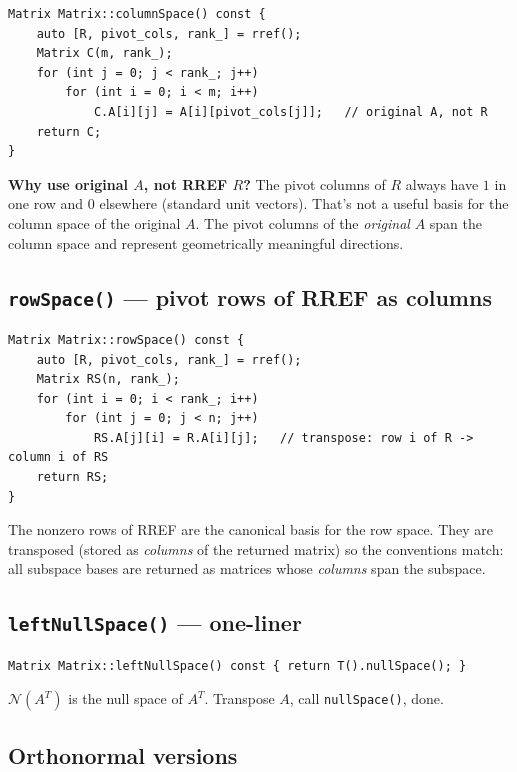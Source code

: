\documentclass[12pt, a4paper]{article}
\newcommand{\fn}[1]{\texttt{\small\color{funcgreen}#1}}
\begin{document}
\begin{lstlisting}
Matrix Matrix::columnSpace() const {
    auto [R, pivot_cols, rank_] = rref();
    Matrix C(m, rank_);
    for (int j = 0; j < rank_; j++)
        for (int i = 0; i < m; i++)
            C.A[i][j] = A[i][pivot_cols[j]];   // original A, not R
    return C;
}
\end{lstlisting}

\textbf{Why use original $A$, not RREF $R$?}  The pivot columns of $R$ always
have $1$ in one row and $0$ elsewhere (standard unit vectors).  That's not a
useful basis for the column space of the original $A$.  The pivot columns of
the \emph{original} $A$ span the column space and represent geometrically
meaningful directions.

\subsection{\fn{rowSpace()} --- pivot rows of RREF as columns}

\begin{lstlisting}
Matrix Matrix::rowSpace() const {
    auto [R, pivot_cols, rank_] = rref();
    Matrix RS(n, rank_);
    for (int i = 0; i < rank_; i++)
        for (int j = 0; j < n; j++)
            RS.A[j][i] = R.A[i][j];   // transpose: row i of R -> column i of RS
    return RS;
}
\end{lstlisting}

The nonzero rows of RREF are the canonical basis for the row space.  They are
transposed (stored as \emph{columns} of the returned matrix) so the
conventions match: all subspace bases are returned as matrices whose
\emph{columns} span the subspace.

\subsection{\fn{leftNullSpace()} --- one-liner}

\begin{lstlisting}
Matrix Matrix::leftNullSpace() const { return T().nullSpace(); }
\end{lstlisting}

$\mathcal{N}(A^T)$ is the null space of $A^T$.  Transpose $A$, call
\fn{nullSpace()}, done.

\subsection{Orthonormal versions}
\end{document}
